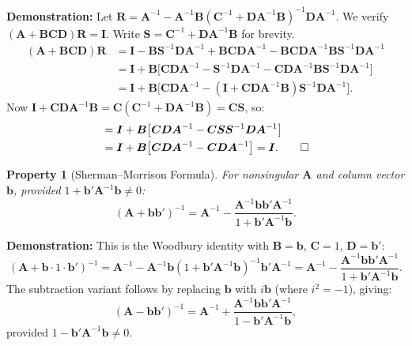 \documentclass[11pt]{article}
\newtheorem{property}{Property}
\newcommand{\Ainv}{\bm{A}^{-1}}
\newcommand{\A}{\bm{A}}
\newcommand{\B}{\bm{B}}
\newcommand{\I}{\bm{I}}
\begin{document}
\textbf{Demonstration:} Let $\bm{R} = \Ainv - \Ainv\B(\bm{C}^{-1} + \bm{D}\Ainv\B)^{-1}\bm{D}\Ainv$. We verify $(\A + \B\bm{C}\bm{D})\bm{R} = \I$. Write $\bm{S} = \bm{C}^{-1} + \bm{D}\Ainv\B$ for brevity.
\begin{align*}
(\A + \B\bm{C}\bm{D})\bm{R}
&= \I - \B\bm{S}^{-1}\bm{D}\Ainv + \B\bm{C}\bm{D}\Ainv - \B\bm{C}\bm{D}\Ainv\B\bm{S}^{-1}\bm{D}\Ainv \\
&= \I + \B\bigl[\bm{C}\bm{D}\Ainv - \bm{S}^{-1}\bm{D}\Ainv - \bm{C}\bm{D}\Ainv\B\bm{S}^{-1}\bm{D}\Ainv\bigr] \\
&= \I + \B\bigl[\bm{C}\bm{D}\Ainv - (\I + \bm{C}\bm{D}\Ainv\B)\bm{S}^{-1}\bm{D}\Ainv\bigr].
\end{align*}
Now $\I + \bm{C}\bm{D}\Ainv\B = \bm{C}(\bm{C}^{-1} + \bm{D}\Ainv\B) = \bm{C}\bm{S}$, so:
\begin{align*}
&= \I + \B\bigl[\bm{C}\bm{D}\Ainv - \bm{C}\bm{S}\bm{S}^{-1}\bm{D}\Ainv\bigr] \\
&= \I + \B\bigl[\bm{C}\bm{D}\Ainv - \bm{C}\bm{D}\Ainv\bigr] = \I. \qed
\end{align*}

\begin{property}[Sherman--Morrison Formula]
For nonsingular $\A$ and column vector $\bm{b}$, provided $1 + \bm{b}'\Ainv\bm{b} \neq 0$:
\[
(\A + \bm{b}\bm{b}')^{-1} = \Ainv - \frac{\Ainv\bm{b}\bm{b}'\Ainv}{1 + \bm{b}'\Ainv\bm{b}}.
\]
\end{property}

\textbf{Demonstration:} This is the Woodbury identity with $\B = \bm{b}$, $\bm{C} = 1$, $\bm{D} = \bm{b}'$:
\[
(\A + \bm{b}\cdot 1\cdot\bm{b}')^{-1}
= \Ainv - \Ainv\bm{b}(1 + \bm{b}'\Ainv\bm{b})^{-1}\bm{b}'\Ainv
= \Ainv - \frac{\Ainv\bm{b}\bm{b}'\Ainv}{1 + \bm{b}'\Ainv\bm{b}}.
\]
The subtraction variant follows by replacing $\bm{b}$ with $i\bm{b}$ (where $i^2 = -1$), giving:
\[
(\A - \bm{b}\bm{b}')^{-1} = \Ainv + \frac{\Ainv\bm{b}\bm{b}'\Ainv}{1 - \bm{b}'\Ainv\bm{b}},
\]
provided $1 - \bm{b}'\Ainv\bm{b} \neq 0$.
\end{document}
